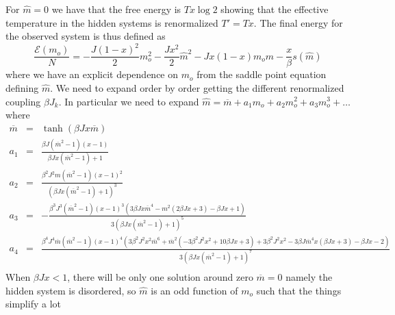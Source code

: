 \documentclass[aps,pre,noshowpacs]{revtex4}
\begin{document}
For $\hat{m}=0$ we have that the free energy is $Tx \log 2$ showing that the effective temperature in the hidden systems is renormalized $T'=T x$.
The final energy for the observed system is thus defined as
\begin{equation}
\frac{\mathcal{E}(m_o)}{N}= -\frac{J (1-x)^2 }{2} m_o^2 -\frac{J x^2}{2 } \hat{m}^2 -  J x(1-x) m_o \hat{m} -\frac{x}{\beta} s(\hat{m})  \end{equation}
where we have an explicit dependence on $m_o$ from the saddle point equation defining $\hat{m}$. We need to expand order by order getting the different renormalized coupling $\beta J_k$. In particular we need to expand $\hat{m}=\overline{m} + a_1 m_o +a_2 m_o^2 +a_3 m_o^3 + \ldots $ where
\begin{eqnarray}
\overline{m}&=&\tanh( \beta J x \overline{m})\nonumber\\
a_1&=&\frac{\beta  J \left( \overline{m}^2-1\right) (x-1)}{\beta  J x\left( \overline{m}^2-1\right) +1}\nonumber \\
a_2 &=& \frac{\beta^2J^2 m \left(\overline{m}^2-1\right) (x-1)^2}{\left(\beta J x \left(\overline{m}^2-1\right) +1\right)^3}\nonumber\\
a_3 &=&-\frac{\beta ^3 J^3 \left(\overline{m}^2-1\right) (x-1)^3 \left(3 \beta  J x \overline{m}^4 -m^2 (2 \beta  J x+3)-\beta  J x+1\right)}{3 \left(\beta  J x\left(\overline{m}^2-1\right) +1\right)^5}\nonumber\\
a_4 &=&\frac{\beta ^4 J^4 \overline{m} \left(\overline{m}^2-1\right) (x-1)^4 \left(3 \beta ^2 J^2 x^2 \overline{m}^6 +\overline{m}^2 \left(-3 \beta ^2 J^2 x^2+10 \beta  J x+3\right)+3 \beta ^2 J^2 x^2-3 \beta  J \overline{m}^4 x (\beta  J x+3)-\beta  J x-2\right)}{3 \left(\beta  J x\left(\overline{m}^2-1\right) +1\right)^7} \nonumber\\
\end{eqnarray}
When $\beta J x <1$, there will be only one solution around zero $\overline{m}=0$ namely the hidden system is disordered, so $\hat{m}$ is an odd function of $m_o$ such that the things simplify a lot
\end{document}
